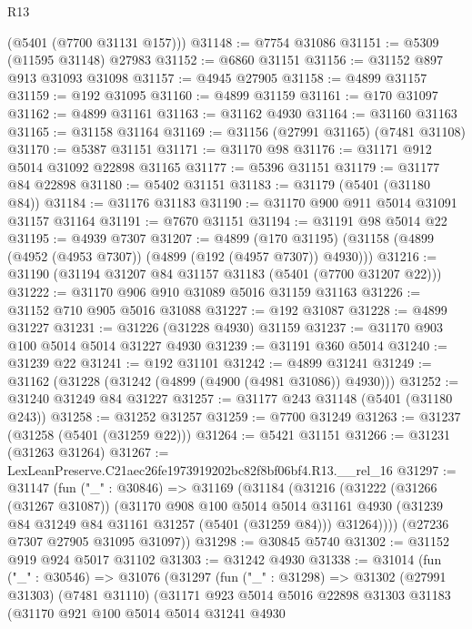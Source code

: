 \begin{lexlean}{R13}
\begin{coremodule}
      (@5401 (@7700 @31131 @157)))
@31148 := @7754 @31086
@31151 := @5309 (@11595 @31148) @27983
@31152 := @6860 @31151
@31156 := @31152 @897 @913 @31093 @31098
@31157 := @4945 @27905
@31158 := @4899 @31157
@31159 := @192 @31095
@31160 := @4899 @31159
@31161 := @170 @31097
@31162 := @4899 @31161
@31163 := @31162 @4930
@31164 := @31160 @31163
@31165 := @31158 @31164
@31169 := @31156 (@27991 @31165) (@7481 @31108)
@31170 := @5387 @31151
@31171 := @31170 @98
@31176 := @31171 @912 @5014 @31092 @22898 @31165
@31177 := @5396 @31151
@31179 := @31177 @84 @22898
@31180 := @5402 @31151
@31183 := @31179 (@5401 (@31180 @84))
@31184 := @31176 @31183
@31190 := @31170 @900 @911 @5014 @31091 @31157 @31164
@31191 := @7670 @31151
@31194 := @31191 @98 @5014 @22
@31195 := @4939 @7307
@31207 := @4899
    (@170 @31195)
    (@31158 (@4899 (@4952 (@4953 @7307)) (@4899 (@192 (@4957 @7307)) @4930)))
@31216 := @31190 (@31194 @31207 @84 @31157 @31183 (@5401 (@7700 @31207 @22)))
@31222 := @31170 @906 @910 @31089 @5016 @31159 @31163
@31226 := @31152 @710 @905 @5016 @31088
@31227 := @192 @31087
@31228 := @4899 @31227
@31231 := @31226 (@31228 @4930) @31159
@31237 := @31170 @903 @100 @5014 @5014 @31227 @4930
@31239 := @31191 @360 @5014
@31240 := @31239 @22
@31241 := @192 @31101
@31242 := @4899 @31241
@31249 := @31162 (@31228 (@31242 (@4899 (@4900 (@4981 @31086)) @4930)))
@31252 := @31240 @31249 @84 @31227
@31257 := @31177 @243 @31148 (@5401 (@31180 @243))
@31258 := @31252 @31257
@31259 := @7700 @31249
@31263 := @31237 (@31258 (@5401 (@31259 @22)))
@31264 := @5421 @31151
@31266 := @31231 (@31263 @31264)
@31267 := LexLeanPreserve.C21aec26fe1973919202bc82f8bf06bf4.R13.__rel_16
@31297 := @31147
    (fun ("_" : @30846) =>
    @31169
      (@31184
        (@31216
          (@31222
            (@31266 (@31267 @31087))
            (@31170
              @908
              @100
              @5014
              @5014
              @31161
              @4930
              (@31239 @84 @31249 @84 @31161 @31257 (@5401 (@31259 @84)))
              @31264))))
      (@27236 @7307 @27905 @31095 @31097))
@31298 := @30845 @5740
@31302 := @31152 @919 @924 @5017 @31102
@31303 := @31242 @4930
@31338 := @31014
    (fun ("_" : @30546) =>
    @31076
      (@31297
        (fun ("_" : @31298) =>
        @31302
          (@27991 @31303)
          (@7481 @31110)
          (@31171
            @923
            @5014
            @5016
            @22898
            @31303
            @31183
            (@31170
              @921
              @100
              @5014
              @5014
              @31241
              @4930

\end{coremodule}
\end{lexlean}
